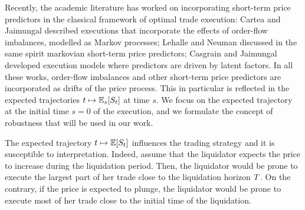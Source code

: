 \documentclass[10pt,a4paper]{article}
\begin{document}
%	

Recently, the academic literature has worked on incorporating short-term price predictors in the classical framework of optimal trade execution: Cartea and Jaimungal \cite{CJ16inc} described executions that incorporate the effects of order-flow imbalances, modelled as Markov processes;  Lehalle and Neuman \cite{LN19inc} discussed in the same spirit  markovian short-term price predictors; Casgrain and Jaimungal \cite{CJ19tra} developed execution models where  predictors are driven by latent factors.
In all these works, order-flow imbalances and other short-term price predictors are incorporated as drifts of the price process. This in particular is reflected in the expected trajectories $t\mapsto\mathbb{{E}}_s [S_{t}]$ at time $s$. We focus on the expected trajectory at the initial time $s=0$ of the execution, and we formulate the concept of robustness that will be used in our work. 

The expected trajectory $t\mapsto \mathbb{{E}} [S_t]$ influences the trading strategy and it is susceptible to interpretation. Indeed, assume that the liquidator expects the price to increase during the liquidation period. Then, the liquidator would be prone to execute the largest part of her trade close to the liquidation horizon $T$. On the contrary, if the price is expected to plunge, the liquidator would be prone to execute most of her trade close to the initial time of the liquidation. 
\end{document}
